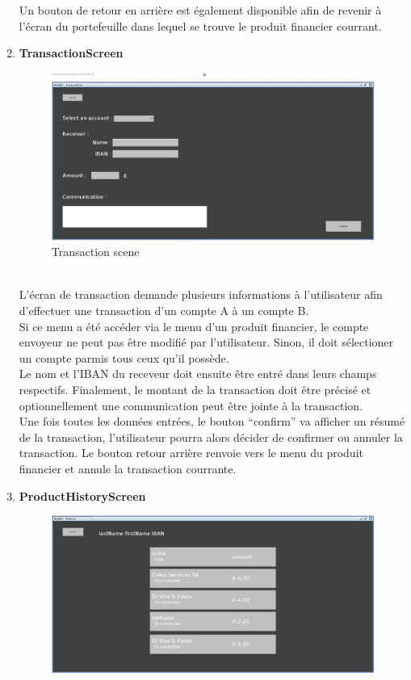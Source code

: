 \documentclass[../rapport.tex]{subfiles}
\begin{document}
\begin{enumerate}
Un bouton de retour en arrière est également disponible afin de revenir à l'écran du portefeuille dans lequel se trouve le produit financier courrant.
\newpage
\item \textbf{TransactionScreen}\\
		\begin{figure}[h!]
				\centering \includegraphics[scale=0.2]{ressources/photos_diagrammes/app1/gui/performTransaction.jpg}
				\caption{Transaction scene}
		\end{figure}
		\\
L'écran de transaction demande plusieurs informations à l'utilisateur afin d'effectuer une transaction d'un compte A à un compte B.\\
Si ce menu a été accéder via le menu d'un produit financier, le compte envoyeur ne peut pas être modifié par l'utilisateur. Sinon, il doit sélectioner un compte parmis tous ceux qu'il possède.\\
Le nom et l'IBAN du receveur doit ensuite être entré dans leurs champs respectifs. Finalement, le montant de la transaction doit être précisé et optionnellement une communication peut être jointe à la transaction.\\
Une fois toutes les données entrées, le bouton ``confirm'' va afficher un résumé de la transaction, l'utilisateur pourra alors décider de confirmer ou annuler la transaction.
Le bouton retour arrière renvoie vers le menu du produit financier et annule la transaction courrante.
\newpage
\item \textbf{ProductHistoryScreen}\\
		\begin{figure}[h!]
				\centering \includegraphics[scale=0.2]{ressources/photos_diagrammes/app1/gui/productHistory.jpg}

\end{figure}
\end{enumerate}
\end{document}
